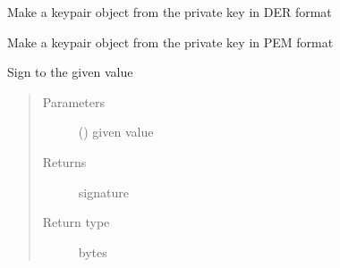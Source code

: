 \documentclass[letterpaper,10pt,english]{sphinxmanual}
\begin{document}
\begin{fulllineitems}

\begin{fulllineitems}
\label{\detokenize{bbc1.core.bbclib:bbc1.core.bbclib.KeyPair.mk_keyobj_from_private_key_der}}
Make a keypair object from the private key in DER format

\end{fulllineitems}


\begin{fulllineitems}
\label{\detokenize{bbc1.core.bbclib:bbc1.core.bbclib.KeyPair.mk_keyobj_from_private_key_pem}}
Make a keypair object from the private key in PEM format

\end{fulllineitems}


\begin{fulllineitems}
\label{\detokenize{bbc1.core.bbclib:bbc1.core.bbclib.KeyPair.sign}}
Sign to the given value
\begin{quote}\begin{description}
\item[{Parameters}] \leavevmode
{} () \textendash{} given value

\item[{Returns}] \leavevmode
signature

\item[{Return type}] \leavevmode
bytes

\end{description}\end{quote}

\end{fulllineitems}


\begin{fulllineitems}
\label{\detokenize{bbc1.core.bbclib:bbc1.core.bbclib.KeyPair.to_bigint}}
\end{fulllineitems}


\end{fulllineitems}
\end{document}
